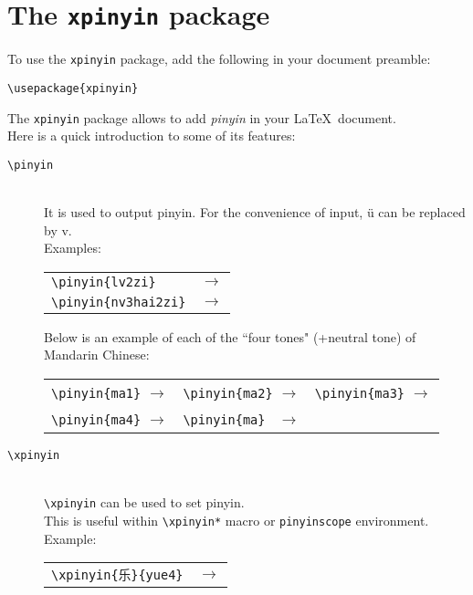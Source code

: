 \section*{The \texttt{xpinyin} package}

To use the \texttt{xpinyin} package, add the following in your document preamble:
\begin{lstlisting}
\usepackage{xpinyin}
\end{lstlisting}

The \texttt{xpinyin} package allows to add \emph{pinyin} in your \LaTeX\ document. \\ 

Here is a quick introduction to some of its features:

\begin{description}
	\item[\texttt{\textbackslash pinyin}] \mbox{}\\
	It is used to output pinyin. For the convenience of input, ü can be replaced by v. \\
	Examples:
	\begin{tabular}{ l l }
		\lstinline|\pinyin{lv2zi}|     & $\rightarrow$ \pinyin{lv2zi}\\
		\lstinline|\pinyin{nv3hai2zi}| & $\rightarrow$ \pinyin{nv3hai2zi} \\	
	\end{tabular}

	\newpage
	Below is an example of each of the ``four tones" (+neutral tone) of Mandarin Chinese:
	
	\begin{tabular}{ l l l }
		  \lstinline|\pinyin{ma1}| $\rightarrow$ \pinyin{ma1} 
		& \lstinline|\pinyin{ma2}| $\rightarrow$ \pinyin{ma2} 
		& \lstinline|\pinyin{ma3}| $\rightarrow$ \pinyin{ma3} \\
		
		  \lstinline|\pinyin{ma4}| $\rightarrow$ \pinyin{ma4}
		& \lstinline|\pinyin{ma} |  $\rightarrow$ \pinyin{ma}  \\
	\end{tabular}
	\bigskip
	
	\item[\texttt{\textbackslash xpinyin}] \mbox{}\\
	\lstinline|\xpinyin| can be used to set pinyin. \\
	This is useful within \texttt{\textbackslash xpinyin*} macro or \texttt{pinyinscope} environment. \\
	Example: \\
	\begin{tabular}{ l l }
		\lstinline|\xpinyin{乐}{yue4}| & $\rightarrow$ \xpinyin{乐}{yue4}\\	
	\end{tabular}
	

\end{description}
